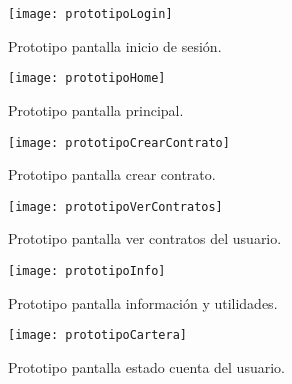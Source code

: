 \begin{figure}[h]
	\label{img:prototipoLogin}
	\centering
	\texttt{[image: prototipoLogin]}
	\caption[Prototipo pantalla inicio de sesión]{Prototipo pantalla inicio de sesión.}
\end{figure}

\begin{figure}[h]
	\label{img:prototipoHome}
	\centering
	\texttt{[image: prototipoHome]}
	\caption[Prototipo pantalla principal]{Prototipo pantalla principal.}
\end{figure}

\begin{figure}[h]
	\label{img:prototipoCrearContrato}
	\centering
	\texttt{[image: prototipoCrearContrato]}
	\caption[Prototipo pantalla crear contrato]{Prototipo pantalla crear contrato.}
\end{figure}

\begin{figure}[h]
	\label{img:prototipoVerContratos}
	\centering
	\texttt{[image: prototipoVerContratos]}
	\caption[Prototipo pantalla ver contratos del usuario]{Prototipo pantalla ver contratos del usuario.}
\end{figure}

\begin{figure}[h]
	\label{img:prototipoInfo}
	\centering
	\texttt{[image: prototipoInfo]}
	\caption[Prototipo pantalla información y utilidades]{Prototipo pantalla información y utilidades.}
\end{figure}

\begin{figure}[h]
	\label{img:prototipoCartera}
	\centering
	\texttt{[image: prototipoCartera]}
	\caption[Prototipo pantalla estado cuenta del usuario]{Prototipo pantalla estado cuenta del usuario.}
\end{figure}
